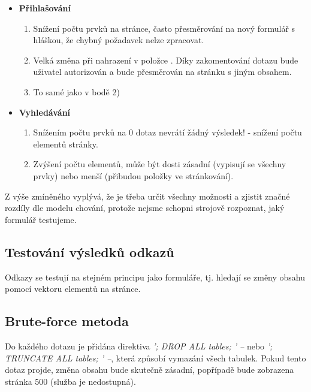 \documentclass[12pt, a4paper]{report}
\begin{document}
\begin{itemize}
\item \textbf{Přihlašování}
\begin{enumerate}
\item Snížení počtu prvků na stránce, často přesměrování na nový formulář s hláškou, že chybný požadavek nelze zpracovat.
\item Velká změna při nahrazení v položce . Díky zakomentování dotazu bude uživatel autorizován a bude přesměrován na stránku s jiným obsahem.
\item To samé jako v bodě 2)
\end{enumerate}
\item \textbf{Vyhledávání}
\begin{enumerate}
\item Snížením počtu prvků na 0 dotaz nevrátí žádný výsledek! - snížení počtu elementů stránky.
\item Zvýšení počtu elementů, může být dosti zásadní (vypisují se všechny prvky) nebo menší (přibudou položky ve stránkování).
\end{enumerate}
\end{itemize}
Z výše zmíněného vyplývá, že je třeba určit všechny možnosti a zjistit značné rozdíly dle modelu chování, protože nejsme schopni strojově rozpoznat, jaký formulář testujeme.

\subsection{Testování výsledků odkazů}
Odkazy se testují na stejném principu jako formuláře, tj. hledají se změny obsahu pomocí vektoru elementů na stránce.

\subsection{Brute-force metoda}
Do každého dotazu je přidána direktiva \textit{'; DROP ALL tables; ' --} nebo \textit{'; TRUNCATE ALL tables; ' --}, která způsobí vymazání všech tabulek. Pokud tento dotaz projde, změna obsahu bude skutečně zásadní, popřípadě bude zobrazena stránka 500 (služba je nedostupná).


\end{document}

